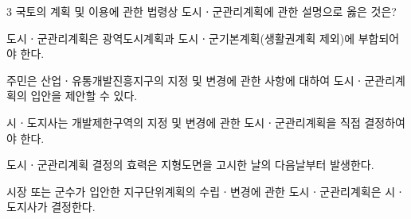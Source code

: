 \begin{question}{3}
국토의 계획 및 이용에 관한 법령상 도시ㆍ군관리계획에 관한 설명으로 옳은 것은?
\begin{choices}
  \item 도시ㆍ군관리계획은 광역도시계획과 도시ㆍ군기본계획(생활권계획 제외)에 부합되어야 한다.
  \item 주민은 산업ㆍ유통개발진흥지구의 지정 및 변경에 관한 사항에 대하여 도시ㆍ군관리계획의 입안을 제안할 수 있다.
  \item 시ㆍ도지사는 개발제한구역의 지정 및 변경에 관한 도시ㆍ군관리계획을 직접 결정하여야 한다.
  \item 도시ㆍ군관리계획 결정의 효력은 지형도면을 고시한 날의 다음날부터 발생한다.
  \item 시장 또는 군수가 입안한 지구단위계획의 수립ㆍ변경에 관한 도시ㆍ군관리계획은 시ㆍ도지사가 결정한다.
\end{choices}
\end{question}
